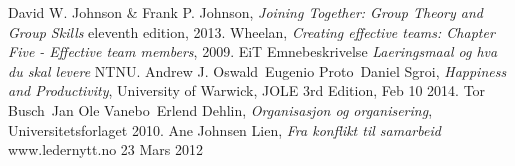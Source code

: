 \begin{thebibliography}{99}	%
		David W. Johnson \& Frank P. Johnson,
		\emph{Joining Together: Group Theory and Group Skills}
		eleventh edition,
		2013.
		Wheelan,
		\emph{Creating effective teams: Chapter Five - Effective team members},
		2009.
		EiT Emnebeskrivelse
		\emph{Laeringsmaal og hva du skal levere}
		NTNU.
		Andrew J. Oswald\, Eugenio Proto\, Daniel Sgroi,
		\emph{Happiness and Productivity},
		University of Warwick,
		JOLE 3rd Edition, Feb 10 2014.
		Tor Busch\, Jan Ole Vanebo\, Erlend Dehlin,
		\emph{Organisasjon og organisering},
		Universitetsforlaget 2010.
		Ane Johnsen Lien,
		\emph{Fra konflikt til samarbeid}
		www.ledernytt.no
		23 Mars 2012
\end{thebibliography}
